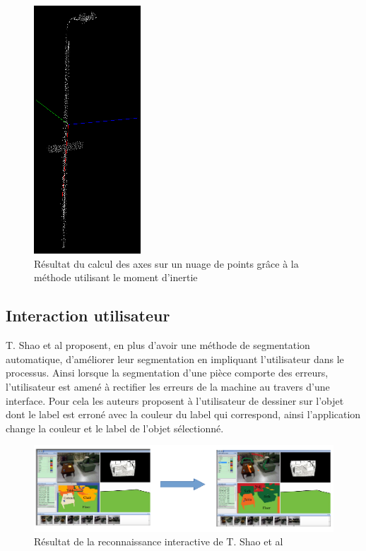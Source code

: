 \begin{figure}[!ht]
  \begin{center}
    \includegraphics[width=4cm]{image/objectAxis.png}
    \caption{Résultat du calcul des axes sur un nuage de points grâce à la méthode utilisant le moment d'inertie}
  \end{center}
\end{figure}

\subsection{Interaction utilisateur}
T. Shao et al\cite{interactiveSeg} proposent, en plus d'avoir une méthode de segmentation automatique, d'améliorer leur 
segmentation en impliquant l'utilisateur dans le processus. Ainsi lorsque la segmentation d'une pièce comporte des erreurs, 
l'utilisateur est amené à rectifier les erreurs de la machine au travers d'une interface.
Pour cela les auteurs proposent à l'utilisateur de dessiner sur l'objet dont le label est erroné avec la couleur du label 
qui correspond, ainsi l'application change la couleur et le label de l'objet sélectionné.\\ 

\begin{figure}[!ht]
  \begin{center}
    \includegraphics[width=15cm]{image/recoInteractive1.png}
    \caption{Résultat de la reconnaissance interactive de T. Shao et al\cite{interactiveSeg}}
  \end{center}
\end{figure}

